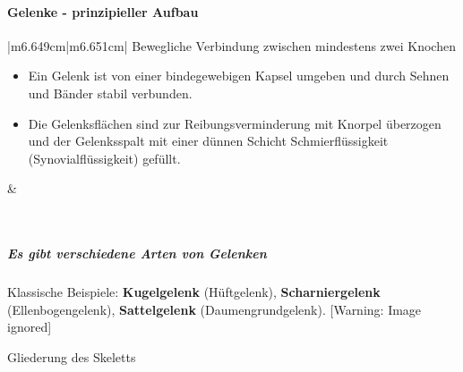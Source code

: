 \documentclass{article}
\newcommand\gT[1]{\textbf{\textup{\textcolor[rgb]{0.0,0.5019608,0.0}{#1}}}}
\newcommand\gZ[1]{\textcolor[rgb]{0.5019608,0.5019608,0.5019608}{#1}}
\begin{document}
\paragraph[Gelenke - \ prinzipieller Aufbau]{Gelenke -  prinzipieller
Aufbau}
\begin{center}
\tablehead{}\begin{supertabular}{|m{6.649cm}|m{6.651cm}|}
\hline
{\mdseries Bewegliche Verbindung zwischen mindestens zwei Knochen}

\begin{itemize}
\item Ein Gelenk ist von einer bindegewebigen Kapsel umgeben und durch
Sehnen und B\"ander stabil verbunden.

\item Die Gelenksfl\"achen sind zur Reibungs\-ver\-minderung mit 
Knorpel \"uberzogen und der Gelenksspalt mit einer d\"unnen Schicht 
Schmierfl\"ussigkeit \gZ{(Synovialfl\"ussigkeit)}
gef\"ullt. 

\end{itemize}
 &
{\par}

\\\hline
\end{supertabular}
\end{center}
\subparagraph{Es gibt verschiedene Arten von Gelenken}
{\mdseries
Klassische Beispiele: \gT{Kugelgelenk}
(H\"uftgelenk),
\gT{Scharniergelenk}
(Ellenbogengelenk),
\gT{Sattelgelenk}
(Daumengrundgelenk).  [Warning: Image ignored]
 }

{\mdseries\color[rgb]{0.0,0.0,0.5019608}
Gliederung des Skeletts}
\end{document}

